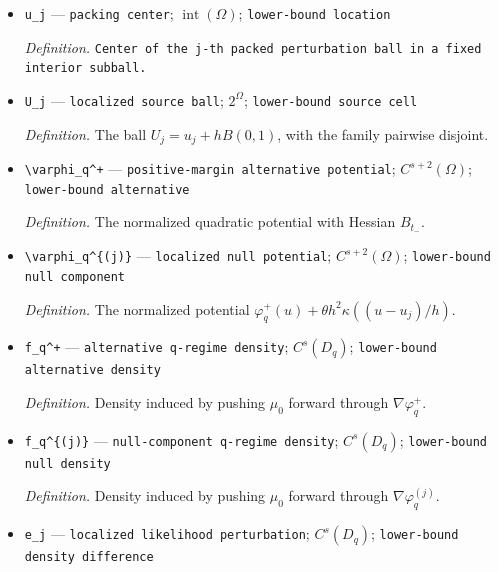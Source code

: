 \documentclass{article}
\begin{document}
\begin{itemize}
  \par\smallskip\noindent\emph{Definition.} \texttt{Second index used in cross-\allowbreak{}likelihood calculations.}
  \item \texttt{u\_\allowbreak{}j} --- \texttt{packing center}; \(\operatorname{int}(\Omega)\); \texttt{lower-\allowbreak{}bound location}
  \par\smallskip\noindent\emph{Definition.} \texttt{Center of the j-\allowbreak{}th packed perturbation ball in a fixed interior subball.}
  \item \texttt{U\_\allowbreak{}j} --- \texttt{localized source ball}; \(2^\Omega\); \texttt{lower-\allowbreak{}bound source cell}
  \par\smallskip\noindent\emph{Definition.} The ball \(U_j=u_j+hB(0,1)\), with the family pairwise disjoint.
  \item \texttt{\textbackslash{}\allowbreak{}varphi\_\allowbreak{}q\textasciicircum{}+\allowbreak{}} --- \texttt{positive-\allowbreak{}margin alternative potential}; \(C^{s+2}(\Omega)\); \texttt{lower-\allowbreak{}bound alternative}
  \par\smallskip\noindent\emph{Definition.} The normalized quadratic potential with Hessian \(B_{t_{-}}\).
  \item \texttt{\textbackslash{}\allowbreak{}varphi\_\allowbreak{}q\textasciicircum{}\{(j)\}\allowbreak{}} --- \texttt{localized null potential}; \(C^{s+2}(\Omega)\); \texttt{lower-\allowbreak{}bound null component}
  \par\smallskip\noindent\emph{Definition.} The normalized potential \(\varphi_q^+(u)+\theta h^2\kappa((u-u_j)/h)\).
  \item \texttt{f\_\allowbreak{}q\textasciicircum{}+\allowbreak{}} --- \texttt{alternative q-\allowbreak{}regime density}; \(C^s(D_q)\); \texttt{lower-\allowbreak{}bound alternative density}
  \par\smallskip\noindent\emph{Definition.} Density induced by pushing \(\mu_0\) forward through \(\nabla\varphi_q^+\).
  \item \texttt{f\_\allowbreak{}q\textasciicircum{}\{(j)\}\allowbreak{}} --- \texttt{null-\allowbreak{}component q-\allowbreak{}regime density}; \(C^s(D_q)\); \texttt{lower-\allowbreak{}bound null density}
  \par\smallskip\noindent\emph{Definition.} Density induced by pushing \(\mu_0\) forward through \(\nabla\varphi_q^{(j)}\).
  \item \texttt{e\_\allowbreak{}j} --- \texttt{localized likelihood perturbation}; \(C^s(D_q)\); \texttt{lower-\allowbreak{}bound density difference}

\end{itemize}
\end{document}
